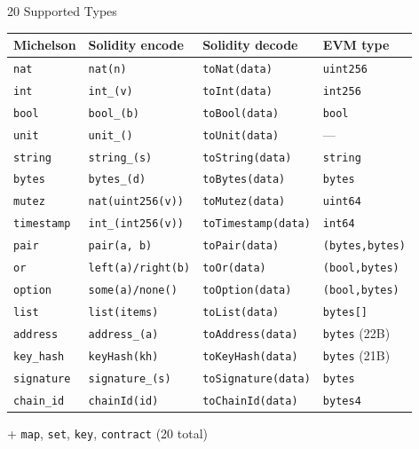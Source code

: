 \documentclass[aspectratio=169,10pt]{beamer}
\begin{document}
\begin{frame}{20 Supported Types}

\begin{center}
\scriptsize
\begin{tabular}{@{}llll@{}}
\toprule
\textbf{Michelson} & \textbf{Solidity encode} & \textbf{Solidity decode} & \textbf{EVM type} \\
\midrule
\texttt{nat}       & \texttt{nat(n)}          & \texttt{toNat(data)}     & \texttt{uint256} \\
\texttt{int}       & \texttt{int\_(v)}        & \texttt{toInt(data)}     & \texttt{int256} \\
\texttt{bool}      & \texttt{bool\_(b)}       & \texttt{toBool(data)}    & \texttt{bool} \\
\texttt{unit}      & \texttt{unit\_()}         & \texttt{toUnit(data)}    & --- \\
\texttt{string}    & \texttt{string\_(s)}     & \texttt{toString(data)}  & \texttt{string} \\
\texttt{bytes}     & \texttt{bytes\_(d)}      & \texttt{toBytes(data)}   & \texttt{bytes} \\
\texttt{mutez}     & \texttt{nat(uint256(v))} & \texttt{toMutez(data)}   & \texttt{uint64} \\
\texttt{timestamp} & \texttt{int\_(int256(v))} & \texttt{toTimestamp(data)} & \texttt{int64} \\
\midrule
\texttt{pair}      & \texttt{pair(a, b)}      & \texttt{toPair(data)}    & \texttt{(bytes,bytes)} \\
\texttt{or}        & \texttt{left(a)/right(b)} & \texttt{toOr(data)}     & \texttt{(bool,bytes)} \\
\texttt{option}    & \texttt{some(a)/none()}  & \texttt{toOption(data)}  & \texttt{(bool,bytes)} \\
\texttt{list}      & \texttt{list(items)}     & \texttt{toList(data)} & \texttt{bytes[]} \\
\midrule
\texttt{address}   & \texttt{address\_(a)}    & \texttt{toAddress(data)} & \texttt{bytes} (22B) \\
\texttt{key\_hash} & \texttt{keyHash(kh)}     & \texttt{toKeyHash(data)} & \texttt{bytes} (21B) \\
\texttt{signature} & \texttt{signature\_(s)}  & \texttt{toSignature(data)} & \texttt{bytes} \\
\texttt{chain\_id} & \texttt{chainId(id)}     & \texttt{toChainId(data)} & \texttt{bytes4} \\
\bottomrule
\end{tabular}
\end{center}

\smallskip
\centering + \texttt{map}, \texttt{set}, \texttt{key}, \texttt{contract} (20 total)
\end{frame}
\end{document}
